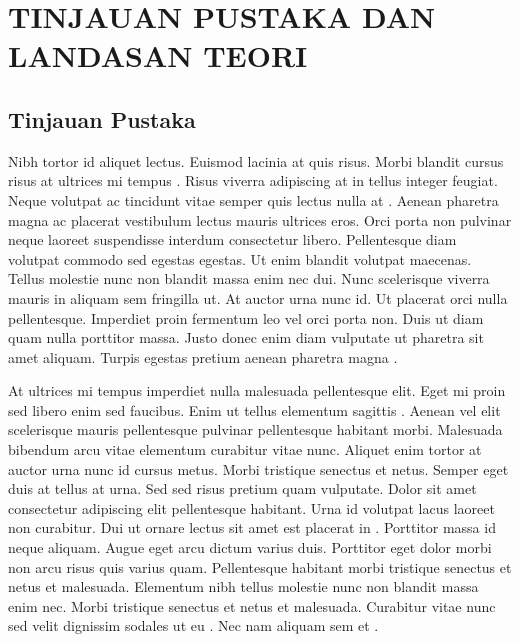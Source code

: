 \chapter{TINJAUAN PUSTAKA DAN LANDASAN TEORI}
\lipsum[90]
\section{Tinjauan Pustaka}
Nibh tortor id aliquet lectus. Euismod lacinia at quis risus. Morbi blandit cursus risus at ultrices mi tempus \cite{Mortazavi2015,Hasheminamin2015}. Risus viverra adipiscing at in tellus integer feugiat. Neque volutpat ac tincidunt vitae semper quis lectus nulla at \cite{Abdelkader2020}. Aenean pharetra magna ac placerat vestibulum lectus mauris ultrices eros. Orci porta non pulvinar neque laoreet suspendisse interdum consectetur libero. Pellentesque diam volutpat commodo sed egestas egestas. Ut enim blandit volutpat maecenas. Tellus molestie nunc non blandit massa enim nec dui. Nunc scelerisque viverra mauris in aliquam sem fringilla ut. At auctor urna nunc id. Ut placerat orci nulla pellentesque. Imperdiet proin fermentum leo vel orci porta non. Duis ut diam quam nulla porttitor massa. Justo donec enim diam vulputate ut pharetra sit amet aliquam. Turpis egestas pretium aenean pharetra magna \cite{Breker2015}.

At ultrices mi tempus imperdiet nulla malesuada pellentesque elit. Eget mi proin sed libero enim sed faucibus. Enim ut tellus elementum sagittis \cite{Beck2016}. Aenean vel elit scelerisque mauris pellentesque pulvinar pellentesque habitant morbi. Malesuada bibendum arcu vitae elementum curabitur vitae nunc. Aliquet enim tortor at auctor urna nunc id cursus metus. Morbi tristique senectus et netus. Semper eget duis at tellus at urna. Sed sed risus pretium quam vulputate. Dolor sit amet consectetur adipiscing elit pellentesque habitant. Urna id volutpat lacus laoreet non curabitur. Dui ut ornare lectus sit amet est placerat in \cite{Gooding2014,Breker2015,Wang2020}. Porttitor massa id neque aliquam. Augue eget arcu dictum varius duis. Porttitor eget dolor morbi non arcu risus quis varius quam. Pellentesque habitant morbi tristique senectus et netus et malesuada. Elementum nibh tellus molestie nunc non blandit massa enim nec. Morbi tristique senectus et netus et malesuada. Curabitur vitae nunc sed velit dignissim sodales ut eu \cite{Hasheminamin2015}. Nec nam aliquam sem et \cite{Atmaja2022}.
